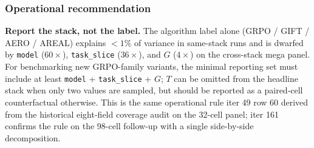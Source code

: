 \begin{table}[ht]
\centering\small
{}
\caption{Head-to-head $\eta^2$ decomposition: algorithm axis (N2 same-stack,
Tier A) vs each stack axis (mega panel, Tier B). $\eta^2_{\mathrm{algo}} =
0.0075$ is the Ivison (NeurIPS 2024) baseline. Three of four individual
stack axes dominate the algorithm axis by 4--60$\times$; the four-axis
union explains $\eta^2 = 0.9967$ of cross-cell variance. The
\texttt{temperature} axis NULL is informative: only $T \in \{0.6, 1.0\}$
are sampled, and the \texttt{model} axis absorbs the variance. The
\texttt{step} axis NULL is the within-run learning curve (40 steps
$\gg$ typical), not a refutation.}
\label{tab:p5-iter161-head-to-head}
\end{table}

\subsubsection{Operational recommendation}
\label{sec:p5-iter161-recommendation}
\textbf{Report the stack, not the label.} The algorithm label alone
(GRPO / GIFT / AERO / AREAL) explains $<1\%$ of variance in same-stack
runs and is dwarfed by \texttt{model} ($60\times$), \texttt{task\_slice}
($36\times$), and $G$ ($4\times$) on the cross-stack mega panel.
For benchmarking new GRPO-family variants, the minimal reporting set
must include at least \texttt{model} + \texttt{task\_slice} + $G$;
$T$ can be omitted from the headline stack when only two values are
sampled, but should be reported as a paired-cell counterfactual
otherwise. This is the same operational rule iter 49 row 60 derived
from the historical eight-field coverage audit on the 32-cell panel; iter
161 confirms the rule on the 98-cell follow-up with a single
side-by-side decomposition.

